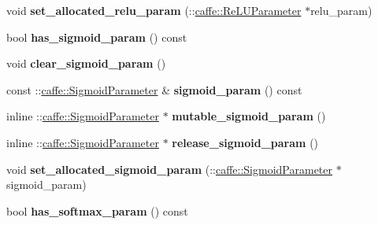 \begin{DoxyCompactItemize}
\item 
\mbox{\label{classcaffe_1_1_v1_layer_parameter_a10dd0a956f6bb751c24b56bbf4c2b222}} 
void {\bfseries set\+\_\+allocated\+\_\+relu\+\_\+param} (\+::\mbox{\hyperlink{classcaffe_1_1_re_l_u_parameter}{caffe\+::\+Re\+L\+U\+Parameter}} $\ast$relu\+\_\+param)
\item 
\mbox{\label{classcaffe_1_1_v1_layer_parameter_ad4454e1c5529065a7c9d822b6cc79450}} 
bool {\bfseries has\+\_\+sigmoid\+\_\+param} () const
\item 
\mbox{\label{classcaffe_1_1_v1_layer_parameter_a7cbfbf79f5418aa366b29feccb12d963}} 
void {\bfseries clear\+\_\+sigmoid\+\_\+param} ()
\item 
\mbox{\label{classcaffe_1_1_v1_layer_parameter_a35c2ef9727d2efb6534923c90a54a623}} 
const \+::\mbox{\hyperlink{classcaffe_1_1_sigmoid_parameter}{caffe\+::\+Sigmoid\+Parameter}} \& {\bfseries sigmoid\+\_\+param} () const
\item 
\mbox{\label{classcaffe_1_1_v1_layer_parameter_a388347c6908058a631d81b25ce7db9a1}} 
inline \+::\mbox{\hyperlink{classcaffe_1_1_sigmoid_parameter}{caffe\+::\+Sigmoid\+Parameter}} $\ast$ {\bfseries mutable\+\_\+sigmoid\+\_\+param} ()
\item 
\mbox{\label{classcaffe_1_1_v1_layer_parameter_a2bc8b7d0d5e838dbd1b3369a8bc84e7e}} 
inline \+::\mbox{\hyperlink{classcaffe_1_1_sigmoid_parameter}{caffe\+::\+Sigmoid\+Parameter}} $\ast$ {\bfseries release\+\_\+sigmoid\+\_\+param} ()
\item 
\mbox{\label{classcaffe_1_1_v1_layer_parameter_ab09188c18c497536489b3d99b8beff35}} 
void {\bfseries set\+\_\+allocated\+\_\+sigmoid\+\_\+param} (\+::\mbox{\hyperlink{classcaffe_1_1_sigmoid_parameter}{caffe\+::\+Sigmoid\+Parameter}} $\ast$sigmoid\+\_\+param)
\item 
\mbox{\label{classcaffe_1_1_v1_layer_parameter_a7d91291ea192a4305fe884cae9bd8644}} 
bool {\bfseries has\+\_\+softmax\+\_\+param} () const

\end{DoxyCompactItemize}
